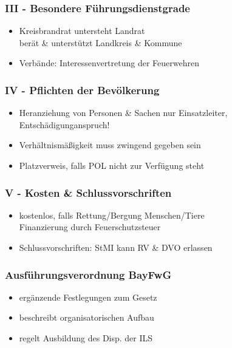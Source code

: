\begin{normbox}{\subsubsection{III - Besondere Führungsdienstgrade}}
    \begin{itemize}
        \item Kreisbrandrat untersteht Landrat\\
        \ra berät \& unterstützt Landkreis \& Kommune
        \item Verbände: Interessenvertretung der Feuerwehren\\
    \end{itemize}
\end{normbox}
\begin{normbox}{\subsubsection{IV - Pflichten der Bevölkerung}}
    \begin{itemize}
        \item Heranziehung von Personen \& Sachen
        \ra nur Einsatzleiter, Entschädigunganspruch!\\
        \item Verhältnismäßigkeit muss zwingend gegeben sein
        \item Platzverweis, falls POL nicht zur Verfügung steht
    \end{itemize}
\end{normbox}
\begin{normbox}{\subsubsection{V - Kosten \& Schlussvorschriften}}
    \begin{itemize}
        \item kostenlos, falls Rettung/Bergung Menschen/Tiere\\
        \ra Finanzierung durch Feuerschutzsteuer
        \item Schlussvorschriften: StMI kann RV \& DVO erlassen
    \end{itemize}
\end{normbox}
\begin{normbox}{\subsubsection{Ausführungsverordnung BayFwG}}
    \begin{itemize}
        \item ergänzende Festlegungen zum Gesetz
        \item beschreibt organisatorischen Aufbau
        \item regelt Ausbildung des Disp. der ILS
    \end{itemize}
\end{normbox}
